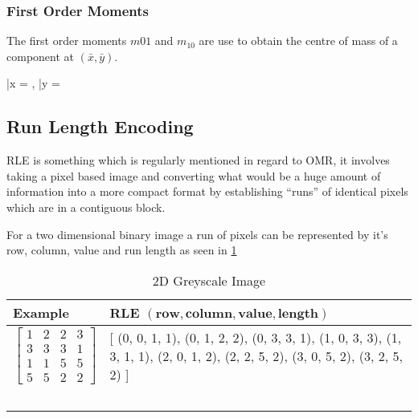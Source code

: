 \subsubsection{First Order Moments}

The first order moments $m{01}$ and $m_{10}$ are use to obtain the centre of mass of a component at $(\bar{x}, \bar{y})$.

\begin{lequation}\label{eqn:1-moment-mass}
\bar{x} = , \bar{y} = 
\end{lequation}

\subsection{Run Length Encoding}
\label{sec:tb-rle}

\acrfull{RLE} is something which is regularly mentioned in regard to OMR, it involves taking a pixel based image and converting what would be a huge amount of information into a more compact format by establishing ``runs'' of identical pixels which are in a contiguous block.

For a two dimensional binary image a run of pixels can be represented by it's row, column, value and run length \parencite[p. 27-28]{burger2009principles} as seen in \cref{table:rle-2d}

\begin{table}[H]

    \begin{tabularx}{\textwidth}{ X | X }
        \toprule
        Example & RLE $(\textbf{row}, \textbf{column}, \textbf{value}, \textbf{length})$\\
        \midrule

        $$\begin{bmatrix}
        1 & 2 & 2 & 3  \\
        3 & 3 & 3 & 1  \\
        1 & 1 & 5 & 5  \\
        5 & 5 & 2 & 2
        \end{bmatrix}$$

        &
        {[} (0, 0, 1, 1), (0, 1, 2, 2), (0, 3, 3, 1), \newline
        (1, 0, 3, 3), (1, 3, 1, 1), (2, 0, 1, 2), \newline
        (2, 2, 5, 2), (3, 0, 5, 2), (3, 2, 5, 2) {]} \\
        \ & \ \\
    \bottomrule
    \end{tabularx}

    \caption{2D Greyscale Image}
    \label{table:rle-2d}
\end{table}


